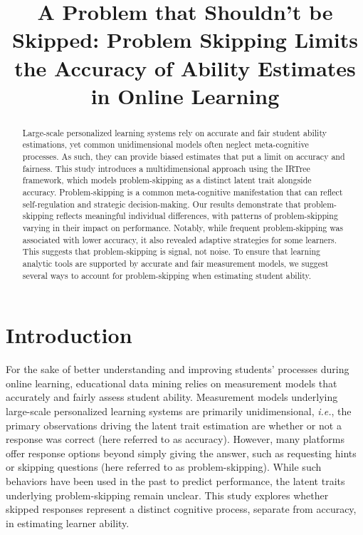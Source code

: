 \documentclass[12pt]{article}
\begin{document}
 

\title{A Problem that Shouldn't be Skipped: Problem Skipping Limits the Accuracy of Ability Estimates in Online Learning}


\maketitle
\begin{abstract}
Large-scale personalized learning systems rely on accurate and fair student ability estimations, yet common unidimensional models often neglect meta-cognitive processes. As such, they can provide biased estimates that put a limit on accuracy and fairness. This study introduces a multidimensional approach using the IRTree framework, which models problem-skipping as a distinct latent trait alongside accuracy. Problem-skipping is a common meta-cognitive manifestation that can reflect self-regulation and strategic decision-making. Our results demonstrate that problem-skipping reflects meaningful individual differences, with patterns of problem-skipping varying in their impact on performance. Notably, while frequent problem-skipping was associated with lower accuracy, it also revealed adaptive strategies for some learners. This suggests that problem-skipping is signal, not noise. To ensure that learning analytic tools are supported by accurate and fair measurement models, we suggest several ways to account for problem-skipping when estimating student ability.       
\end{abstract}

\section{Introduction}
For the sake of better understanding and improving students' processes during online learning, educational data mining relies on measurement models that accurately and fairly assess student ability. Measurement models underlying large-scale personalized learning systems are primarily unidimensional, \textit{i.e.}, the primary observations driving the latent trait estimation are whether or not a response was correct (here referred to as accuracy). However, many platforms offer response options beyond simply giving the answer, such as requesting hints or skipping questions (here referred to as problem-skipping). While such behaviors have been used in the past to predict performance, the latent traits underlying problem-skipping remain unclear. This study explores whether skipped responses represent a distinct cognitive process, separate from accuracy, in estimating learner ability. 
\end{document}
